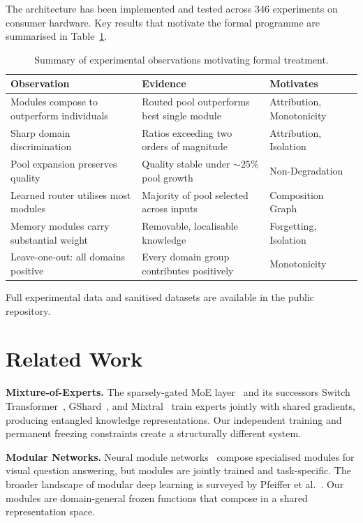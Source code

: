 \documentclass[11pt,a4paper]{article}
\begin{document}
The architecture has been implemented and tested across 346 experiments on consumer hardware. Key results that motivate the formal programme are summarised in Table~\ref{tab:experiments}.

\begin{table}[h]
\centering
\caption{Summary of experimental observations motivating formal treatment.}
\label{tab:experiments}
\begin{tabular}{@{}lll@{}}
\toprule
\textbf{Observation} & \textbf{Evidence} & \textbf{Motivates} \\
\midrule
Modules compose to outperform individuals & Routed pool outperforms best single module & Attribution, Monotonicity \\
Sharp domain discrimination & Ratios exceeding two orders of magnitude & Attribution, Isolation \\
Pool expansion preserves quality & Quality stable under ${\sim}25\%$ pool growth & Non-Degradation \\
Learned router utilises most modules & Majority of pool selected across inputs & Composition Graph \\
Memory modules carry substantial weight & Removable, localisable knowledge & Forgetting, Isolation \\
Leave-one-out: all domains positive & Every domain group contributes positively & Monotonicity \\
\bottomrule
\end{tabular}
\end{table}

Full experimental data and sanitised datasets are available in the public repository.

\section{Related Work}
\label{sec:related}

\textbf{Mixture-of-Experts.} The sparsely-gated MoE layer~\cite{shazeer2017outrageously} and its successors Switch Transformer~\cite{fedus2022switch}, GShard~\cite{lepikhin2021gshard}, and Mixtral~\cite{jiang2024mixtral} train experts jointly with shared gradients, producing entangled knowledge representations. Our independent training and permanent freezing constraints create a structurally different system.

\textbf{Modular Networks.} Neural module networks~\cite{andreas2016neural} compose specialised modules for visual question answering, but modules are jointly trained and task-specific. The broader landscape of modular deep learning is surveyed by Pfeiffer et al.~\cite{pfeiffer2023modular}. Our modules are domain-general frozen functions that compose in a shared representation space.
\end{document}
